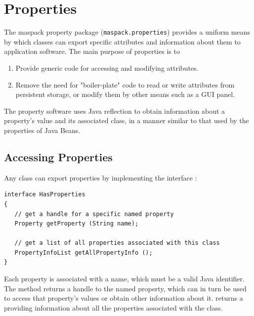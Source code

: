 \chapter{Properties}
\label{properties:sec}

The maspack property package ({\tt maspack.properties}) provides a
uniform means by which classes can export specific attributes and
information about them to application software.  The main purpose of
properties is to

\begin{enumerate}

\item Provide generic code for accessing and modifying attributes. 

\item Remove the need for "boiler-plate" code to read or write attributes
from persistent storage, or modify them by other means such as a GUI
panel.

\end{enumerate}

The property software uses Java reflection to obtain information about
a property's value and its associated class, in a manner similar to
that used by the properties of Java Beans.

\section{Accessing Properties}

Any class can export properties by implementing the
interface :

\begin{lstlisting}[]
interface HasProperties
{
   // get a handle for a specific named property
   Property getProperty (String name);

   // get a list of all properties associated with this class
   PropertyInfoList getAllPropertyInfo ();
}
\end{lstlisting}

Each property is associated with a name, which must be a valid Java
identifier. The
 method returns
a  handle to the named property, 
which can in turn be
used to access that property's values or obtain other information
about it. 
returns a 
providing information about all the properties associated with the
class.

